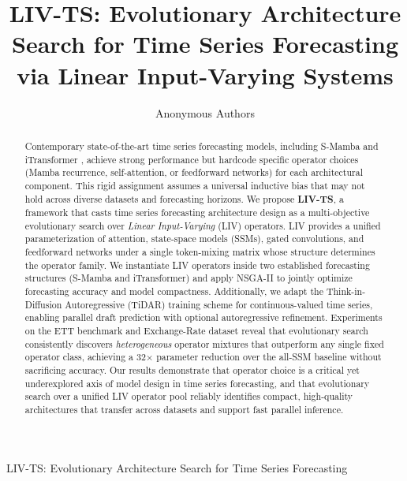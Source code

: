 \documentclass[journal]{IEEEtran}
\begin{document}
\title{LIV-TS: Evolutionary Architecture Search for Time Series Forecasting\\via Linear Input-Varying Systems}

\author{Anonymous Authors}

%
{LIV-TS: Evolutionary Architecture Search for Time Series Forecasting}

\maketitle

\begin{abstract}
Contemporary state-of-the-art time series forecasting models, including S-Mamba \cite{wang2024smamba} and iTransformer \cite{liu2024itransformer}, achieve strong performance but hardcode specific operator choices (Mamba recurrence, self-attention, or feedforward networks) for each architectural component.
This rigid assignment assumes a universal inductive bias that may not hold across diverse datasets and forecasting horizons.
We propose \textbf{LIV-TS}, a framework that casts time series forecasting architecture design as a multi-objective evolutionary search over \emph{Linear Input-Varying} (LIV) \cite{massaroli2024liv} operators.
LIV provides a unified parameterization of attention, state-space models (SSMs), gated convolutions, and feedforward networks under a single token-mixing matrix whose structure determines the operator family.
We instantiate LIV operators inside two established forecasting structures (S-Mamba and iTransformer) and apply NSGA-II \cite{deb2002nsga2} to jointly optimize forecasting accuracy and model compactness.
Additionally, we adapt the Think-in-Diffusion Autoregressive (TiDAR) \cite{tidar2024} training scheme for continuous-valued time series, enabling parallel draft prediction with optional autoregressive refinement.
Experiments on the ETT benchmark and Exchange-Rate dataset reveal that evolutionary search consistently discovers \emph{heterogeneous} operator mixtures that outperform any single fixed operator class, achieving a 32$\times$ parameter reduction over the all-SSM baseline without sacrificing accuracy.
Our results demonstrate that operator choice is a critical yet underexplored axis of model design in time series forecasting, and that evolutionary search over a unified LIV operator pool reliably identifies compact, high-quality architectures that transfer across datasets and support fast parallel inference.
\end{abstract}
\end{document}
